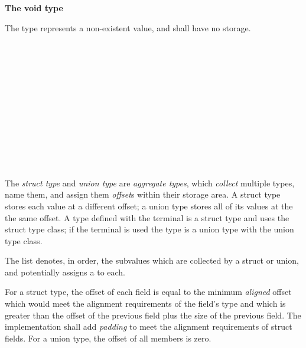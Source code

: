 \textbf{The void type}

\specsubsubitem
The  type represents a non-existent value, and shall have no
storage.


\begin{grammar}
 \\
	 \terminal{\{}  \terminal{\}} \\
	 \terminal{\{}  \terminal{\}} \\

 \\
	 \optional{\terminal{,}} \\
	 \terminal{,}  \\

 \\
	  \terminal{:}  \\
	  \\
	  \\

 \\
	 \terminal{(}  \terminal{)}
\end{grammar}

\specsubsubitem
The \textit{struct type} and \textit{union type} are \textit{aggregate types},
which \textit{collect} multiple types, name them, and assign them
\textit{offset}s within their storage area. A struct type stores each value at a
different offset; a union type stores all of its values at the the same offset.
A type defined with the  terminal is a struct type and uses the
struct type class; if the  terminal is used the type is a union
type with the union type class.

\specsubsubitem
The  list denotes, in order, the subvalues
which are collected by a struct or union, and potentially assigns a
 to each.

\specsubsubitem
For a struct type, the offset of each field is equal to the minimum
\textit{aligned} offset which would meet the alignment requirements of the
field's type and which is greater than the offset of the previous field plus the
size of the previous field. The implementation shall add \textit{padding} to
meet the alignment requirements of struct fields. For a union type, the offset
of all members is zero.

